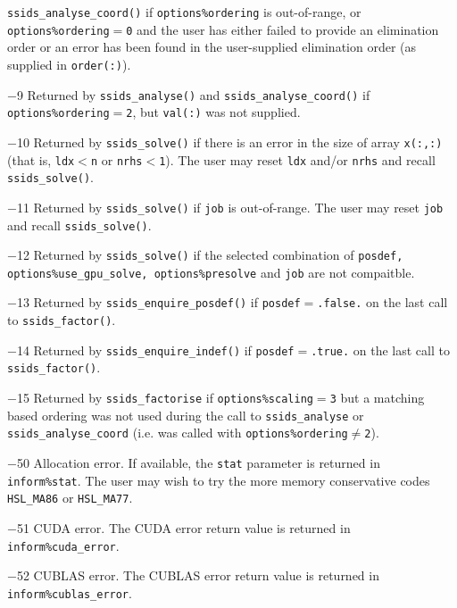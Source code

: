 \documentclass{spral}
\begin{document}
\begin{description}
            {\tt ssids\_analyse\_coord()} if {\tt options\%ordering} is
            out-of-range, or {\tt options\%ordering}$=${\tt 0} and the user
            has either failed to provide an elimination order or an error has
            been found in the user-supplied elimination order (as supplied in
            {\tt order(:)}).
\item{$-$9} Returned by {\tt ssids\_analyse()} and
            {\tt ssids\_analyse\_coord()} if {\tt options\%ordering}$=${\tt 2},
            but {\tt val(:)} was not supplied.
\item{$-$10} Returned by {\tt ssids\_solve()} if there is an error in the size
            of array {\tt x(:,:)} (that is, {\tt ldx$<$n} or {\tt nrhs$<$1}).
            The user may reset {\tt ldx} and/or {\tt nrhs} and recall
            {\tt ssids\_solve()}.
\item{$-$11} Returned by {\tt ssids\_solve()} if {\tt job} is out-of-range.
            The user may reset {\tt job} and recall {\tt ssids\_solve()}.
\item{$-$12} Returned by {\tt ssids\_solve()} if the selected combination of
            {\tt posdef{\rm ,} options\%use\_gpu\_solve{\rm ,}
            options\%presolve} and {\tt job} are not compaitble.
\item{$-$13} Returned by {\tt ssids\_enquire\_posdef()} if
            {\tt posdef}$=${\tt .false.} on the last call
            to {\tt ssids\_factor()}.
\item{$-$14} Returned by {\tt ssids\_enquire\_indef()} if
            {\tt posdef}$=${\tt .true.} on the last call to
            {\tt ssids\_factor()}.
\item{$-$15} Returned by {\tt ssids\_factorise} if {\tt options\%scaling$=$3}
            but a matching based ordering was not used during the call to
            {\tt ssids\_analyse} or {\tt ssids\_analyse\_coord} (i.e. was
            called with
            {\tt options\%ordering}$\ne${\tt 2}).
\item{$-$50} Allocation error. If available, the {\tt stat}
            parameter is returned in {\tt inform\%stat}.
            The user may wish to try the more memory conservative codes
            {\tt HSL\_MA86} or {\tt HSL\_MA77}.
\item{$-$51} CUDA error. The CUDA error return value is returned in
            {\tt inform\%cuda\_error}.
\item{$-$52} CUBLAS error. The CUBLAS error return value is returned in
            {\tt inform\%cublas\_error}.
\end{description}
\end{document}
